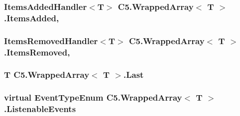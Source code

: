 \hypertarget{class_c5_1_1_wrapped_array_ad4e9059009c3f36ac2a898424e8a07f0}{}
\subsubsection[{Items\+Added}]{\setlength{\rightskip}{0pt plus 5cm}Items\+Added\+Handler$<$T$>$ {\bf C5.\+Wrapped\+Array}$<$ T $>$.Items\+Added\hspace{0.3cm}{\ttfamily [add]}, {\ttfamily [remove]}}\label{class_c5_1_1_wrapped_array_ad4e9059009c3f36ac2a898424e8a07f0}




\hypertarget{class_c5_1_1_wrapped_array_a2589ac72276da70bbf0e341826d29f5a}{}
\subsubsection[{Items\+Removed}]{\setlength{\rightskip}{0pt plus 5cm}Items\+Removed\+Handler$<$T$>$ {\bf C5.\+Wrapped\+Array}$<$ T $>$.Items\+Removed\hspace{0.3cm}{\ttfamily [add]}, {\ttfamily [remove]}}\label{class_c5_1_1_wrapped_array_a2589ac72276da70bbf0e341826d29f5a}




\hypertarget{class_c5_1_1_wrapped_array_a821efefc3fa34125b7a5f2b0108e3ef4}{}
\subsubsection[{Last}]{\setlength{\rightskip}{0pt plus 5cm}T {\bf C5.\+Wrapped\+Array}$<$ T $>$.Last\hspace{0.3cm}{\ttfamily [get]}}\label{class_c5_1_1_wrapped_array_a821efefc3fa34125b7a5f2b0108e3ef4}




\hypertarget{class_c5_1_1_wrapped_array_a7d4694e3b14728396280bad7b17052f4}{}
\subsubsection[{Listenable\+Events}]{\setlength{\rightskip}{0pt plus 5cm}virtual {\bf Event\+Type\+Enum} {\bf C5.\+Wrapped\+Array}$<$ T $>$.Listenable\+Events\hspace{0.3cm}{\ttfamily [get]}}\label{class_c5_1_1_wrapped_array_a7d4694e3b14728396280bad7b17052f4}


